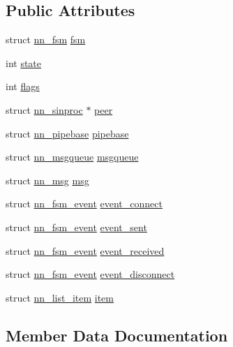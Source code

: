 \subsection*{Public Attributes}
\begin{DoxyCompactItemize}
\item 
struct \hyperlink{structnn__fsm}{nn\+\_\+fsm} \hyperlink{structnn__sinproc_a003cd82bc6cff8db88c1a547a6636cb8}{fsm}
\item 
int \hyperlink{structnn__sinproc_a4e706c4229c2a6744caa694b4c3d180f}{state}
\item 
int \hyperlink{structnn__sinproc_a68d3ef16b04178ca01f3951bc0be97f7}{flags}
\item 
struct \hyperlink{structnn__sinproc}{nn\+\_\+sinproc} $\ast$ \hyperlink{structnn__sinproc_a5bb8b30fe9e4c46aff1bfe5ef2d555df}{peer}
\item 
struct \hyperlink{structnn__pipebase}{nn\+\_\+pipebase} \hyperlink{structnn__sinproc_ae5e3756290ad85bbe90b48472cea16e1}{pipebase}
\item 
struct \hyperlink{structnn__msgqueue}{nn\+\_\+msgqueue} \hyperlink{structnn__sinproc_ab654cbbbc30b3b2e2a26719492fa4b98}{msgqueue}
\item 
struct \hyperlink{structnn__msg}{nn\+\_\+msg} \hyperlink{structnn__sinproc_acc15a46ac42799ae2a0726f2baae8c4b}{msg}
\item 
struct \hyperlink{structnn__fsm__event}{nn\+\_\+fsm\+\_\+event} \hyperlink{structnn__sinproc_a57b51461aa38deaff898fe1409c685cb}{event\+\_\+connect}
\item 
struct \hyperlink{structnn__fsm__event}{nn\+\_\+fsm\+\_\+event} \hyperlink{structnn__sinproc_af3b3fc50e4e92fc6184eeb88a3ed0422}{event\+\_\+sent}
\item 
struct \hyperlink{structnn__fsm__event}{nn\+\_\+fsm\+\_\+event} \hyperlink{structnn__sinproc_a08ac0565377739a29680295b021fb564}{event\+\_\+received}
\item 
struct \hyperlink{structnn__fsm__event}{nn\+\_\+fsm\+\_\+event} \hyperlink{structnn__sinproc_ae0549cc1eaf399d76ac2f963c199b0df}{event\+\_\+disconnect}
\item 
struct \hyperlink{structnn__list__item}{nn\+\_\+list\+\_\+item} \hyperlink{structnn__sinproc_a21419d9f464d248bb618e8954b80c843}{item}
\end{DoxyCompactItemize}


\subsection{Member Data Documentation}
